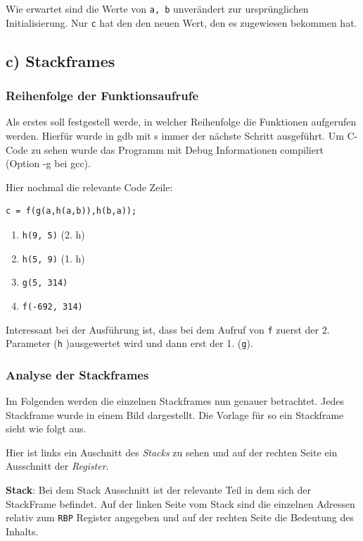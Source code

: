 \documentclass[12pt]{article}
\begin{document}
Wie erwartet sind die Werte von \texttt{a, b} unverändert zur ursprünglichen Initialisierung. Nur \texttt{c} hat den den neuen Wert, den es zugewiesen bekommen hat.

\subsection{c) Stackframes}

\subsubsection{Reihenfolge der Funktionsaufrufe}

Als erstes soll festgestell werde, in welcher Reihenfolge die Funktionen aufgerufen werden. Hierfür wurde in gdb mit s immer der nächste Schritt ausgeführt. Um C-Code zu sehen wurde das Programm mit Debug Informationen compiliert (Option -g bei gcc).

Hier nochmal die relevante Code Zeile:
\begin{lstlisting}
c = f(g(a,h(a,b)),h(b,a));
\end{lstlisting}


\begin{enumerate}
\item \texttt{h(9, 5)} (2. h)
\item \texttt{h(5, 9)} (1. h)
\item \texttt{g(5, 314)}
\item \texttt{f(-692, 314)}
\end{enumerate}

Interessant bei der Ausführung ist, dass bei dem Aufruf von \texttt{f} zuerst der 2. Parameter (\texttt{h} )ausgewertet wird und dann erst der 1. (\texttt{g}).

\subsubsection{Analyse der Stackframes}


Im Folgenden werden die einzelnen Stackframes nun genauer betrachtet. Jedes Stackframe wurde in einem Bild dargestellt. Die Vorlage für so ein Stackframe sieht wie folgt aus. 


Hier ist links ein Auschnitt des \textit{Stacks} zu sehen und auf der rechten Seite ein Ausschnitt der \textit{Register}. 

\textbf{Stack}: \newline
Bei dem Stack Ausschnitt ist der relevante Teil in dem sich der StackFrame befindet. Auf der linken Seite vom Stack sind die einzelnen Adressen relativ zum \texttt{RBP} Register angegeben und auf der rechten Seite die Bedeutung des Inhalts. 
\end{document}
